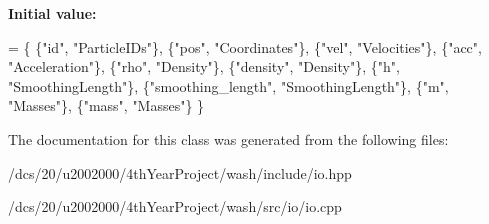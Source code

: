 {\bfseries Initial value\+:}
\begin{DoxyCode}
= \{ 
        \{\textcolor{stringliteral}{"id"}, \textcolor{stringliteral}{"ParticleIDs"}\},
        \{\textcolor{stringliteral}{"pos"}, \textcolor{stringliteral}{"Coordinates"}\},
        \{\textcolor{stringliteral}{"vel"}, \textcolor{stringliteral}{"Velocities"}\},
        \{\textcolor{stringliteral}{"acc"}, \textcolor{stringliteral}{"Acceleration"}\},
        \{\textcolor{stringliteral}{"rho"}, \textcolor{stringliteral}{"Density"}\},
        \{\textcolor{stringliteral}{"density"}, \textcolor{stringliteral}{"Density"}\},
        \{\textcolor{stringliteral}{"h"}, \textcolor{stringliteral}{"SmoothingLength"}\},
        \{\textcolor{stringliteral}{"smoothing\_length"}, \textcolor{stringliteral}{"SmoothingLength"}\},
        \{\textcolor{stringliteral}{"m"}, \textcolor{stringliteral}{"Masses"}\},
        \{\textcolor{stringliteral}{"mass"}, \textcolor{stringliteral}{"Masses"}\}
    \}
\end{DoxyCode}


The documentation for this class was generated from the following files\+:\begin{DoxyCompactItemize}
\item 
/dcs/20/u2002000/4th\+Year\+Project/wash/include/io.\+hpp\item 
/dcs/20/u2002000/4th\+Year\+Project/wash/src/io/io.\+cpp\end{DoxyCompactItemize}
